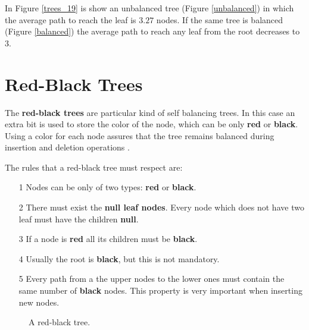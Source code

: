 In Figure \ref{trees_19} is show an unbalanced tree (Figure \ref{unbalanced}) in which the average path to reach the leaf is \(3.27\) nodes. If the same tree is balanced (Figure \ref{balanced}) the average path to reach any leaf from the root decreases to \(3\).

\section{Red-Black Trees}
The \textbf{red-black trees} are particular kind of self balancing trees. In this case an extra bit is used to store the color of the node, which can be only \textbf{red} or \textbf{black}. Using a color for each node assures that the tree remains balanced during insertion and deletion operations \cite{wikiblackred}.

The rules that a red-black tree must respect are:
\begin{itemize}
\item[1] Nodes can be only of two types: \textbf{red} or \textbf{black}.
\item[2] There must exist the \textbf{null leaf nodes}. Every node which does not have two leaf must have the children \textbf{null}.
\item[3] If a node is \textbf{red} all its children must be \textbf{black}.
\item[4] Usually the root is \textbf{black}, but this is not mandatory.
\item[5] Every path from a the upper nodes to the lower ones must contain the same number of \textbf{black} nodes. This property is very important when inserting new nodes.
\end{itemize}

\begin{figure}[H]
\centering
{}
\caption[A red-black tree.]{A red-black tree.}
\label{trees_20}
\end{figure}

